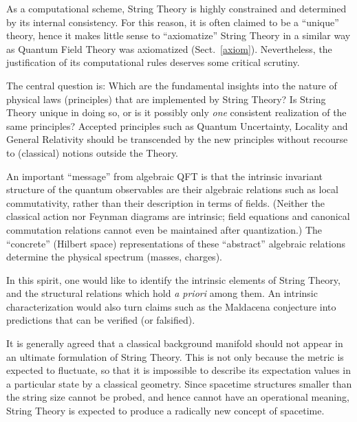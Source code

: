 \documentclass[multphys,vecphys]{svmult}
\begin{document}
As a computational scheme, String Theory is highly constrained and
determined by its internal consistency. For this reason, it is often
claimed to be a ``unique'' theory, hence it makes little sense to
``axiomatize'' String Theory in a similar way as Quantum Field Theory
was axiomatized (Sect.~\ref{axiom}). Nevertheless, the justification of its
computational rules deserves some critical scrutiny. 

The central question is: Which are the fundamental insights into the
nature of physical laws (principles) that are implemented by String
Theory? Is String Theory unique in doing so, or is it possibly only
{\em one} consistent realization of the same principles?  
Accepted principles such as Quantum Uncertainty,
Locality and General Relativity should be transcended
by the new principles without recourse to (classical) notions outside
the Theory. 

An important ``message'' from algebraic QFT
is that the intrinsic invariant structure of the quantum observables
are their algebraic relations such as local
commutativity, rather than their description in terms of
fields. (Neither the classical action nor Feynman diagrams are
intrinsic; field equations and canonical commutation relations cannot
even be maintained after quantization.) 
The ``concrete'' (Hilbert space) representations of these ``abstract''
algebraic relations determine the physical spectrum (masses, charges).   

In this spirit, one would like to identify the intrinsic elements
of String Theory, and the structural relations which hold {\em a priori} 
among them. An intrinsic characterization would also turn claims such
as the Maldacena conjecture into predictions that can be verified (or
falsified).

It is generally agreed that a classical background
manifold should not appear in an ultimate formulation of String
Theory. This is not only because the metric is expected to fluctuate,
so that it is impossible to describe its expectation values in a
particular state by a classical geometry. Since spacetime structures
smaller than the string size cannot be probed, and hence cannot have
an operational meaning, String Theory is expected to produce a
radically new concept of spacetime. 
\end{document}
